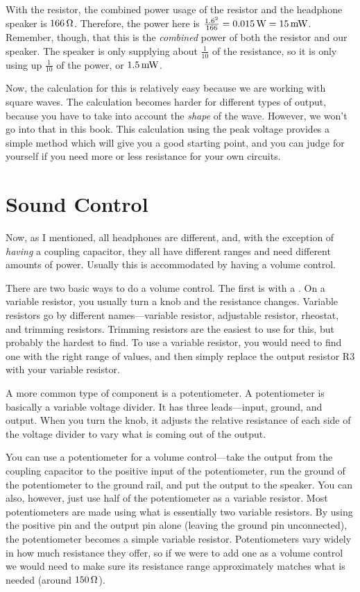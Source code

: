 With the resistor, the combined power usage of the resistor and the headphone speaker is $166\,\si{\ohm}$.
Therefore, the power here is $\frac{1.6^2}{166} = 0.015\,\si{\watt} = 15\,\si{\milli\watt}$.
Remember, though, that this is the \emph{combined} power of both the resistor and our speaker.
The speaker is only supplying about $\frac{1}{10}$ of the resistance, so it is only using up $\frac{1}{10}$ of the power, or $1.5\,\si{\milli\watt}$.

Now, the calculation for this is relatively easy because we are working with square waves.
The calculation becomes harder for different types of output, because you have to take into account the \emph{shape} of the wave.
However, we won't go into that in this book.
This calculation using the peak voltage provides a simple method which will give you a good starting point, and you can judge for yourself if you need more or less resistance for your own circuits.

\section{Sound Control}

Now, as I mentioned, all headphones are different, and, with the exception of \emph{having} a coupling capacitor, they all have different ranges and need different amounts of power.
Usually this is accommodated by having a volume control.

There are two basic ways to do a volume control.
The first is with a .
On a variable resistor, you usually turn a knob and the resistance changes.
Variable resistors go by different names---variable resistor, adjustable resistor, rheostat, and trimming resistors.
Trimming resistors are the easiest to use for this, but probably the hardest to find.
To use a variable resistor, you would need to find one with the right range of values, and then simply replace the output resistor R3 with your variable resistor.

A more common type of component is a potentiometer.
A potentiometer is basically a variable voltage divider.
It has three leads---input, ground, and output.
When you turn the knob, it adjusts the relative resistance of each side of the voltage divider to vary what is coming out of the output.

You can use a potentiometer for a volume control---take the output from the coupling capacitor to the positive input of the potentiometer, run the ground of the potentiometer to the ground rail, and put the output to the speaker.
You can also, however, just use half of the potentiometer as a variable resistor.
Most potentiometers are made using what is essentially two variable resistors.
By using the positive pin and the output pin alone (leaving the ground pin unconnected), the potentiometer becomes a simple variable resistor.
Potentiometers vary widely in how much resistance they offer, so if we were to add one as a volume control we would need to make sure its resistance range approximately matches what is needed (around $150\,\si{\ohm}$).

